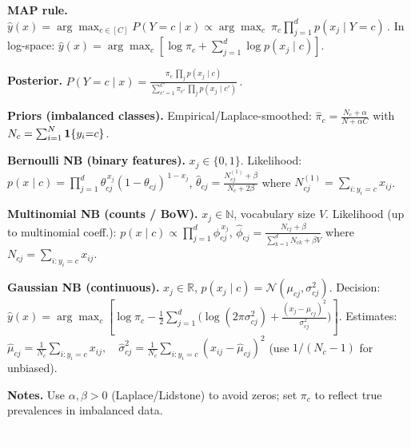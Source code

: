 \documentclass[10pt,landscape]{article}
\begin{document}
\begin{multicols}{3}
        \textbf{MAP rule.} $\displaystyle \hat y(x)=\arg\max_{c\in[C]} P(Y{=}c\mid x) \propto \arg\max_{c}\ \pi_c\prod_{j=1}^d p(x_j\mid Y{=}c) \,.$
        \; In log-space: $\displaystyle \hat y(x)=\arg\max_c \left[\log\pi_c+\sum_{j=1}^d \log p(x_j\mid c)\right]$.
        \vspace{.2em}

        \textbf{Posterior.} $\displaystyle P(Y{=}c\mid x)=\frac{\pi_c\,\prod_{j} p(x_j\mid c)}{\sum_{c'=1}^C \pi_{c'}\,\prod_{j} p(x_j\mid c')}\,.$
        \vspace{.2em}

        \textbf{Priors (imbalanced classes).} Empirical/Laplace-smoothed: $\displaystyle \hat\pi_c=\frac{N_c+\alpha}{N+\alpha C}$ with $N_c=\sum_{i=1}^N \mathbf{1}\{y_i{=}c\}$.
        \vspace{.2em}

        \textbf{Bernoulli NB (binary features).} $x_j\in\{0,1\}$. \;
        Likelihood: $\displaystyle p(x\mid c)=\prod_{j=1}^d \theta_{cj}^{\,x_j}(1-\theta_{cj})^{\,1-x_j}$,\;
    $\displaystyle \hat\theta_{cj}=\frac{N^{(1)}_{cj}+\beta}{N_c+2\beta}$ where $N^{(1)}_{cj}=\sum_{i:y_i=c} x_{ij}$.
        \vspace{.2em}

        \textbf{Multinomial NB (counts / BoW).} $x_j\in\mathbb{N}$, vocabulary size $V$. \;
        Likelihood (up to multinomial coeff.): $\displaystyle p(x\mid c)\propto\prod_{j=1}^d \phi_{cj}^{\,x_j}$,\;
    $\displaystyle \hat\phi_{cj}=\frac{N_{cj}+\beta}{\sum_{k=1}^d N_{ck}+\beta V}$ where $N_{cj}=\sum_{i:y_i=c} x_{ij}$.
        \vspace{.2em}

        \textbf{Gaussian NB (continuous).} $x_j\in\mathbb{R}$, $p(x_j\mid c)=\mathcal{N}(\mu_{cj},\sigma^2_{cj})$. \;
        Decision: $\displaystyle \hat y(x)=\arg\max_c\left[\log\pi_c-\tfrac12\sum_{j=1}^d\Big(\log(2\pi\sigma^2_{cj})+\tfrac{(x_j-\mu_{cj})^2}{\sigma^2_{cj}}\Big)\right]$. \;
        Estimates: $\displaystyle \hat\mu_{cj}=\frac{1}{N_c}\!\sum_{i:y_i=c}\!x_{ij},\quad
    \hat\sigma^2_{cj}=\frac{1}{N_c}\!\sum_{i:y_i=c}\!(x_{ij}-\hat\mu_{cj})^2$ (use $1/(N_c\!-\!1)$ for unbiased).
        \vspace{.2em}

        \textbf{Notes.} Use $\alpha,\beta>0$ (Laplace/Lidstone) to avoid zeros; set $\pi_c$ to reflect true prevalences in imbalanced data.

        \textcolor{white}{.}\vspace{-5mm}\\ %

\end{multicols}
\end{document}
